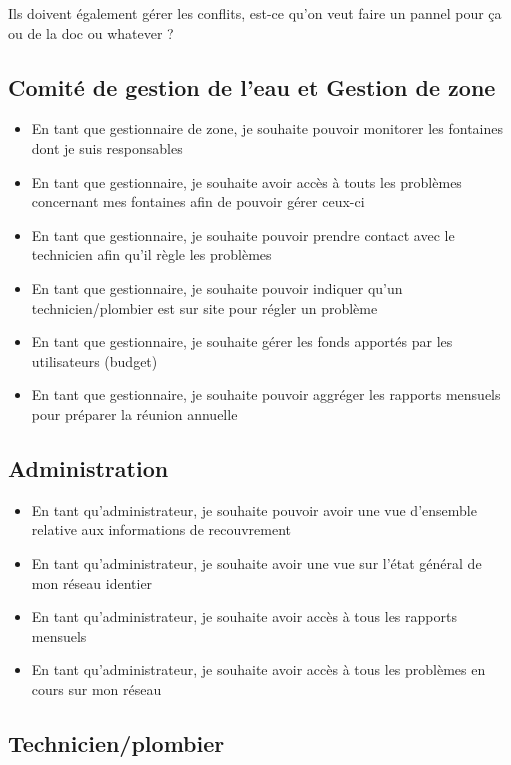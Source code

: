 \documentclass[a4paper, 11pt]{article}
\begin{document}
Ils doivent également gérer les conflits, est-ce qu'on veut faire un pannel pour ça ou de la doc ou whatever ?

\subsection{Comité de gestion de l'eau et Gestion de zone}
\begin{itemize}
  \item En tant que gestionnaire de zone, je souhaite pouvoir monitorer les fontaines dont je suis responsables
  \item En tant que gestionnaire, je souhaite avoir accès à touts les problèmes concernant mes fontaines afin de pouvoir gérer ceux-ci
  \item En tant que gestionnaire, je souhaite pouvoir prendre contact avec le technicien afin qu'il règle les problèmes
  \item En tant que gestionnaire, je souhaite pouvoir indiquer qu'un technicien/plombier est sur site pour régler un problème
  \item En tant que gestionnaire, je souhaite gérer les fonds apportés par les utilisateurs (budget)
  \item En tant que gestionnaire, je souhaite pouvoir aggréger les rapports mensuels pour préparer la réunion annuelle
\end{itemize}

\subsection{Administration}
\begin{itemize}
  \item En tant qu'administrateur, je souhaite pouvoir avoir une vue d'ensemble relative aux informations de recouvrement
  \item En tant qu'administrateur, je souhaite avoir une vue sur l'état général de mon réseau identier
  \item En tant qu'administrateur, je souhaite avoir accès à tous les rapports mensuels
  \item En tant qu'administrateur, je souhaite avoir accès à tous les problèmes en cours sur mon réseau
\end{itemize}

\subsection{Technicien/plombier}
\end{document}
